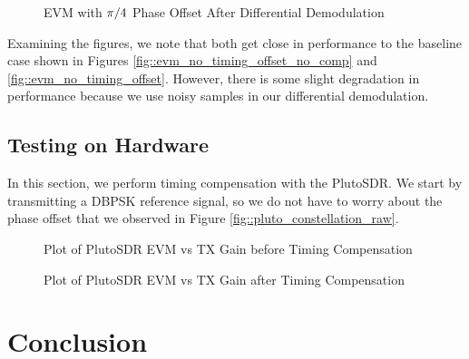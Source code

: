 \documentclass{article}
\begin{document}
\begin{figure}[H]
	\centerline{}
	\caption{EVM with $\protect\pi/4$ Phase Offset After Differential Demodulation}
	\label{fig::evm_dpsk_modulation}
\end{figure}

\noindent Examining the figures, we note that both get close in performance to the baseline case shown in Figures \ref{fig::evm_no_timing_offset_no_comp} and \ref{fig::evm_no_timing_offset}. However, there is some slight degradation in performance because we use noisy samples in our differential demodulation. 

\subsection{Testing on Hardware}

In this section, we perform timing compensation with the PlutoSDR. We start by transmitting a DBPSK reference signal, so we do not have to worry about the phase offset that we observed in Figure \ref{fig::pluto_constellation_raw}.

\begin{figure}[H]
	\centerline{}
	\caption{Plot of PlutoSDR EVM vs TX Gain before Timing Compensation}
	\label{fig::pluto_evm_no_comp}
\end{figure}

\begin{figure}[H]
	\centerline{}
	\caption{Plot of PlutoSDR EVM vs TX Gain after Timing Compensation}
	\label{fig::pluto_evm}
\end{figure}

\section{Conclusion}
	
\end{document}
